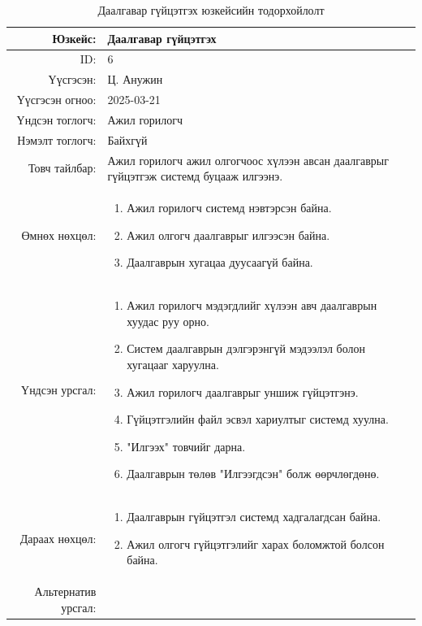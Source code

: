 \begin{longtable}{|r|p{11.5cm}|}
    \caption{Даалгавар гүйцэтгэх юзкейсийн тодорхойлолт}
    \label{table:usecase6}\\ \hline
    {Юзкейс:} & {Даалгавар гүйцэтгэх}\\ \hline
    {ID:} & {6}\\ \hline
    {Үүсгэсэн:} & {Ц. Анужин}\\ \hline
    {Үүсгэсэн огноо:} & {2025-03-21}\\ \hline
    {Үндсэн тоглогч:} & {Ажил горилогч}\\ \hline
    {Нэмэлт тоглогч:} & {Байхгүй}\\ \hline
    {Товч тайлбар:} & {Ажил горилогч ажил олгогчоос хүлээн авсан даалгаврыг гүйцэтгэж системд буцааж илгээнэ.}\\ \hline
    {Өмнөх нөхцөл:} & {\begin{enumerate}[nosep]
        \item Ажил горилогч системд нэвтэрсэн байна.
        \item Ажил олгогч даалгаврыг илгээсэн байна.
        \item Даалгаврын хугацаа дуусаагүй байна.
    \end{enumerate}}\\ \hline
    {Үндсэн урсгал:} & {\begin{enumerate}[nosep]
        \item Ажил горилогч мэдэгдлийг хүлээн авч даалгаврын хуудас руу орно.
        \item Систем даалгаврын дэлгэрэнгүй мэдээлэл болон хугацааг харуулна.
        \item Ажил горилогч даалгаврыг уншиж гүйцэтгэнэ.
        \item Гүйцэтгэлийн файл эсвэл хариултыг системд хуулна.
        \item "Илгээх" товчийг дарна.
        \item Даалгаврын төлөв "Илгээгдсэн" болж өөрчлөгдөнө.
    \end{enumerate}}\\ \hline
    {Дараах нөхцөл:} & {\begin{enumerate}[nosep]
        \item Даалгаврын гүйцэтгэл системд хадгалагдсан байна.
        \item Ажил олгогч гүйцэтгэлийг харах боломжтой болсон байна.
    \end{enumerate}}\\ \hline
    {Альтернатив урсгал:} & {}\\ \hline
\end{longtable}

